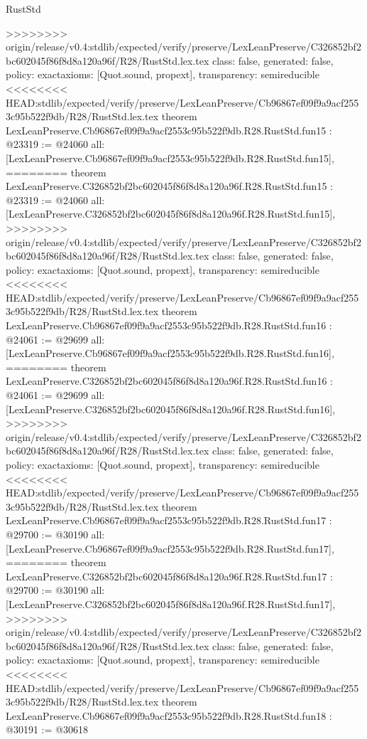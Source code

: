 \begin{lexlean}{RustStd}
\begin{coremodule}
{\begin{coremodule}
{{{{{{{{{{{{{{{{{{>>>>>>>> origin/release/v0.4:stdlib/expected/verify/preserve/LexLeanPreserve/C326852bf2bc602045f86f8d8a120a96f/R28/RustStd.lex.tex
  class: false,
  generated: false,
  policy: exact{axioms: [Quot.sound, propext]},
  transparency: semireducible
}
<<<<<<<< HEAD:stdlib/expected/verify/preserve/LexLeanPreserve/Cb96867ef09f9a9acf2553c95b522f9db/R28/RustStd.lex.tex
theorem LexLeanPreserve.Cb96867ef09f9a9acf2553c95b522f9db.R28.RustStd.fun15 : @23319 := @24060 {
  all: [LexLeanPreserve.Cb96867ef09f9a9acf2553c95b522f9db.R28.RustStd.fun15],
========
theorem LexLeanPreserve.C326852bf2bc602045f86f8d8a120a96f.R28.RustStd.fun15 : @23319 := @24060 {
  all: [LexLeanPreserve.C326852bf2bc602045f86f8d8a120a96f.R28.RustStd.fun15],
>>>>>>>> origin/release/v0.4:stdlib/expected/verify/preserve/LexLeanPreserve/C326852bf2bc602045f86f8d8a120a96f/R28/RustStd.lex.tex
  class: false,
  generated: false,
  policy: exact{axioms: [Quot.sound, propext]},
  transparency: semireducible
}
<<<<<<<< HEAD:stdlib/expected/verify/preserve/LexLeanPreserve/Cb96867ef09f9a9acf2553c95b522f9db/R28/RustStd.lex.tex
theorem LexLeanPreserve.Cb96867ef09f9a9acf2553c95b522f9db.R28.RustStd.fun16 : @24061 := @29699 {
  all: [LexLeanPreserve.Cb96867ef09f9a9acf2553c95b522f9db.R28.RustStd.fun16],
========
theorem LexLeanPreserve.C326852bf2bc602045f86f8d8a120a96f.R28.RustStd.fun16 : @24061 := @29699 {
  all: [LexLeanPreserve.C326852bf2bc602045f86f8d8a120a96f.R28.RustStd.fun16],
>>>>>>>> origin/release/v0.4:stdlib/expected/verify/preserve/LexLeanPreserve/C326852bf2bc602045f86f8d8a120a96f/R28/RustStd.lex.tex
  class: false,
  generated: false,
  policy: exact{axioms: [Quot.sound, propext]},
  transparency: semireducible
}
<<<<<<<< HEAD:stdlib/expected/verify/preserve/LexLeanPreserve/Cb96867ef09f9a9acf2553c95b522f9db/R28/RustStd.lex.tex
theorem LexLeanPreserve.Cb96867ef09f9a9acf2553c95b522f9db.R28.RustStd.fun17 : @29700 := @30190 {
  all: [LexLeanPreserve.Cb96867ef09f9a9acf2553c95b522f9db.R28.RustStd.fun17],
========
theorem LexLeanPreserve.C326852bf2bc602045f86f8d8a120a96f.R28.RustStd.fun17 : @29700 := @30190 {
  all: [LexLeanPreserve.C326852bf2bc602045f86f8d8a120a96f.R28.RustStd.fun17],
>>>>>>>> origin/release/v0.4:stdlib/expected/verify/preserve/LexLeanPreserve/C326852bf2bc602045f86f8d8a120a96f/R28/RustStd.lex.tex
  class: false,
  generated: false,
  policy: exact{axioms: [Quot.sound, propext]},
  transparency: semireducible
}
<<<<<<<< HEAD:stdlib/expected/verify/preserve/LexLeanPreserve/Cb96867ef09f9a9acf2553c95b522f9db/R28/RustStd.lex.tex
theorem LexLeanPreserve.Cb96867ef09f9a9acf2553c95b522f9db.R28.RustStd.fun18 : @30191 := @30618 {
}}}}}}}}}}}}}}}}}}}}}
\end{coremodule}}
\end{coremodule}
\end{lexlean}
